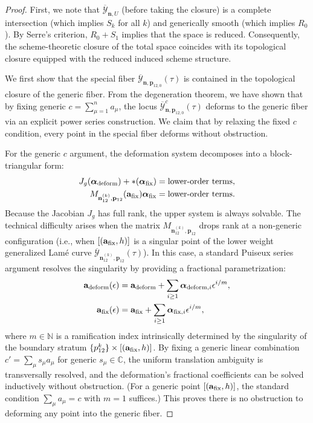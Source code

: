 \documentclass[11pt]{amsart}
\theoremstyle{remark}
\numberwithin{equation}{section}
\begin{document}
\begin{proof}
First, we note that $\overline{\mathcal{Y}}_{\mathbf{n},U}$ (before taking the closure) is a complete intersection (which implies $S_k$ for all $k$) and generically smooth (which implies $R_0$). By Serre's criterion, $R_0 + S_1$ implies that the space is reduced. Consequently, the scheme-theoretic closure of the total space coincides with its topological closure equipped with the reduced induced scheme structure.

We first show that the special fiber $\overline{\mathcal{Y}}_{\mathbf{n}, \mathbf{p}_{12,0}}(\tau)$ is contained in the topological closure of the generic fiber. From the degeneration theorem, we have shown that by fixing generic $c = \sum_{\mu=1}^n a_\mu$, the locus $\overline{\mathcal{Y}}_{\mathbf{n}, \mathbf{p}_{12,0}}^c(\tau)$ deforms to the generic fiber via an explicit power series construction. We claim that by relaxing the fixed $c$ condition, every point in the special fiber deforms without obstruction.

For the generic $c$ argument, the deformation system decomposes into a block-triangular form:
\begin{equation} \label{eqn:deform_dege_sepa}
\begin{split}
 J_g (\boldsymbol{\alpha}_{\rm deform}) + * (\boldsymbol{\alpha}_{\rm fix}) &= \text{lower-order terms},
\\
 M_{\mathbf{n}_{12}^{(k)}, \mathbf{p}_{12}}(\mathbf{a}_{\rm fix}) \boldsymbol{\alpha}_{\rm fix}  &= \text{lower-order terms}.
\end{split}
\end{equation}
Because the Jacobian $J_g$ has full rank, the upper system is always solvable. The technical difficulty arises when the matrix $M_{\mathbf{n}_{12}^{(k)}, \mathbf{p}_{12}}$ drops rank at a non-generic configuration (i.e., when $[(\mathbf{a}_{\rm fix}, h)]$ is a singular point of the lower weight generalized Lam\'e curve $\overline{\mathcal{Y}}_{\mathbf{n}_{12}^{(k)}, \mathbf{p}_{12}}(\tau)$). In this case, a standard Puiseux series argument resolves the singularity by providing a fractional parametrization:
\[
\begin{split}
 \mathbf{a}_{\rm deform}(\epsilon) &= \mathbf{a}_{\rm deform} + \sum_{i \geq 1} \boldsymbol{\alpha}_{{\rm deform},i} \epsilon^{i/m},
 \\
 \mathbf{a}_{\rm fix}(\epsilon) &= \mathbf{a}_{\rm fix} + \sum_{i \geq 1} \boldsymbol{\alpha}_{{\rm fix},i} \epsilon^{i/m},
\end{split}
\]
where $m \in \mathbb{N}$ is a ramification index intrinsically determined by the singularity of the boundary stratum $\{p_{12}^k\} \times [(\mathbf{a}_{\rm fix}, h)]$. By fixing a generic linear combination $c' = \sum_\mu s_\mu a_\mu$ for generic $s_\mu \in \mathbb{C}$, the uniform translation ambiguity is transversally resolved, and the deformation's fractional coefficients can be solved inductively without obstruction. (For a generic point $[(\mathbf{a}_{\rm fix}, h)]$, the standard condition $\sum_\mu a_\mu = c$ with $m=1$ suffices.) This proves there is no obstruction to deforming any point into the generic fiber.


\end{proof}
\end{document}
